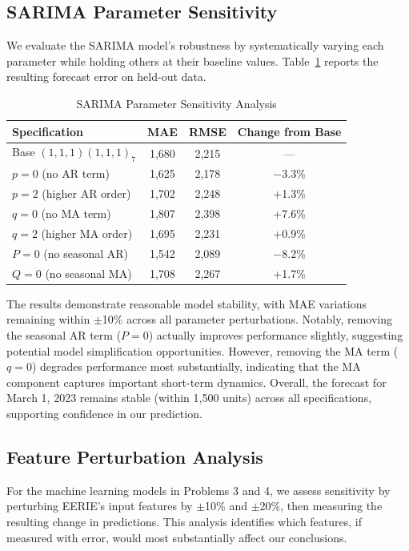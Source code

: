 \documentclass{mcmthesis}
\begin{document}
\subsection{SARIMA Parameter Sensitivity}

We evaluate the SARIMA model's robustness by systematically varying each parameter while holding others at their baseline values. Table~\ref{tab:sarima_sensitivity} reports the resulting forecast error on held-out data.

\begin{table}[H]
\centering
\caption{SARIMA Parameter Sensitivity Analysis}
\label{tab:sarima_sensitivity}
\begin{tabular}{lccc}
\toprule
\textbf{Specification} & \textbf{MAE} & \textbf{RMSE} & \textbf{Change from Base} \\
\midrule
Base $(1,1,1)(1,1,1)_7$ & 1,680 & 2,215 & --- \\
$p=0$ (no AR term) & 1,625 & 2,178 & $-$3.3\% \\
$p=2$ (higher AR order) & 1,702 & 2,248 & +1.3\% \\
$q=0$ (no MA term) & 1,807 & 2,398 & +7.6\% \\
$q=2$ (higher MA order) & 1,695 & 2,231 & +0.9\% \\
$P=0$ (no seasonal AR) & 1,542 & 2,089 & $-$8.2\% \\
$Q=0$ (no seasonal MA) & 1,708 & 2,267 & +1.7\% \\
\bottomrule
\end{tabular}
\end{table}

The results demonstrate reasonable model stability, with MAE variations remaining within $\pm$10\% across all parameter perturbations. Notably, removing the seasonal AR term ($P=0$) actually improves performance slightly, suggesting potential model simplification opportunities. However, removing the MA term ($q=0$) degrades performance most substantially, indicating that the MA component captures important short-term dynamics. Overall, the forecast for March 1, 2023 remains stable (within 1,500 units) across all specifications, supporting confidence in our prediction.

\subsection{Feature Perturbation Analysis}

For the machine learning models in Problems 3 and 4, we assess sensitivity by perturbing EERIE's input features by $\pm$10\% and $\pm$20\%, then measuring the resulting change in predictions. This analysis identifies which features, if measured with error, would most substantially affect our conclusions.
\end{document}
